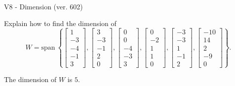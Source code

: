 \begin{exercise}
  \begin{exerciseTitle}V8 - Dimension (ver. 602)\end{exerciseTitle}
  \begin{exerciseStatement}
    Explain how to find the dimension of 
\[W=\mathrm{span}\ \left\{\left[\begin{array}{r}
1 \\
-3 \\
-4 \\
-1 \\
3
\end{array}\right] , \left[\begin{array}{r}
3 \\
-3 \\
-1 \\
2 \\
0
\end{array}\right] , \left[\begin{array}{r}
0 \\
0 \\
-4 \\
-3 \\
3
\end{array}\right] , \left[\begin{array}{r}
0 \\
-2 \\
1 \\
1 \\
0
\end{array}\right] , \left[\begin{array}{r}
-3 \\
-3 \\
1 \\
-1 \\
2
\end{array}\right] , \left[\begin{array}{r}
-10 \\
14 \\
2 \\
-9 \\
0
\end{array}\right]\right\}.\]



  \end{exerciseStatement}
  \begin{exerciseAnswer}
   The dimension of \(W\) is  \(5\).
  


  \end{exerciseAnswer}
\end{exercise}